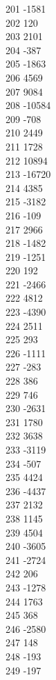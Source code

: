 { 201	-1581 \\
 202	120 \\
 203	2101 \\
 204	-387 \\
 205	-1863 \\
 206	4569 \\
 207	9084 \\
 208	-10584 \\
 209	-708 \\
 210	2449 \\
 211	1728 \\
 212	10894 \\
 213	-16720 \\
 214	4385 \\
 215	-3182 \\
 216	-109 \\
 217	2966 \\
 218	-1482 \\
 219	-1251 \\
 220	192 \\
 221	-2466 \\
 222	4812 \\
 223	-4390 \\
 224	2511 \\
 225	293 \\
 226	-1111 \\
 227	-283 \\
 228	386 \\
 229	746 \\
 230	-2631 \\
 231	1780 \\
 232	3638 \\
 233	-3119 \\
 234	-507 \\
 235	4424 \\
 236	-4437 \\
 237	2132 \\
 238	1145 \\
 239	4504 \\
 240	-3605 \\
 241	-2724 \\
 242	206 \\
 243	-1278 \\
 244	1763 \\
 245	368 \\
 246	-2580 \\
 247	148 \\
 248	-193 \\
 249	-197 \\
}
